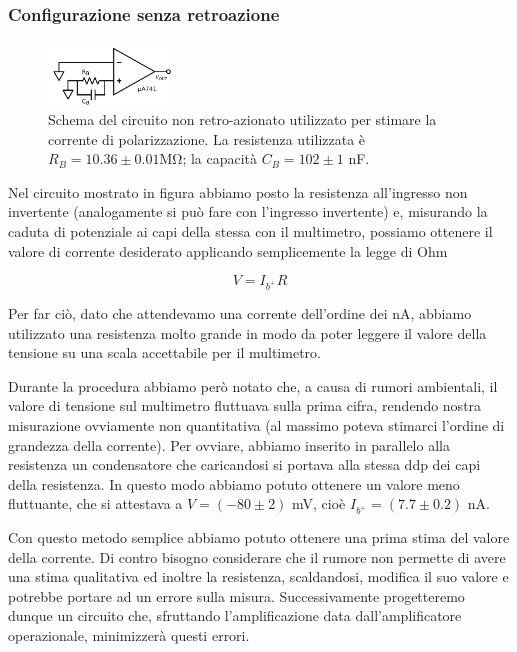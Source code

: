 \subsubsection{Configurazione senza retroazione}

\begin{figure}
  \begin{center}
    \includegraphics[width=0.30\textwidth]{../E02/latex/direct_measure.pdf}
  \end{center}
  \caption{Schema del circuito non retro-azionato utilizzato per stimare la corrente di polarizzazione. La resistenza utilizzata è $R_B=10.36\pm0.01$\si{\mega\ohm}; la capacità $C_B=102 \pm 1$ \si{\nano\farad}.}
  \label{circuito:rel2_correnti_senzaretroazione}
\end{figure}

Nel circuito mostrato in figura abbiamo posto la resistenza all'ingresso non invertente (analogamente si può fare con l'ingresso invertente) e, misurando la caduta di potenziale ai capi della stessa con il multimetro, possiamo ottenere il valore di corrente desiderato applicando semplicemente la legge di Ohm

$$V=I_{b^+} R$$

Per far ciò, dato che attendevamo una corrente dell'ordine dei \si{\nano\ampere}, abbiamo utilizzato una resistenza molto grande in modo da poter leggere il valore della tensione su una scala accettabile per il multimetro.

Durante la procedura abbiamo però notato che, a causa di rumori ambientali, il valore di tensione sul multimetro fluttuava sulla prima cifra, rendendo nostra misurazione ovviamente non quantitativa (al massimo poteva stimarci l'ordine di grandezza della corrente). Per ovviare, abbiamo inserito in parallelo alla resistenza un condensatore che caricandosi si portava alla stessa ddp dei capi della resistenza. In questo modo abbiamo potuto ottenere un valore meno fluttuante, che si attestava a $V=(-80 \pm 2)$ \si{\milli\volt}, cioè $I_{b^+}=(7.7 \pm 0.2)$ \si{\nano\ampere}.

Con questo metodo semplice abbiamo potuto ottenere una prima stima del valore della corrente. Di contro bisogno considerare che il rumore non permette di avere una stima qualitativa ed inoltre la resistenza, scaldandosi, modifica il suo valore e potrebbe portare ad un errore sulla misura. Successivamente progetteremo dunque un circuito che, sfruttando l'amplificazione data dall'amplificatore operazionale, minimizzerà questi errori.

